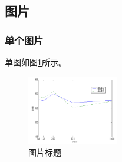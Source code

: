 \documentclass{nwputhesis}
\begin{document}
\subsection{图片}
\subsubsection{单个图片}
单图如图\ref{P1}所示。
\begin{figure}[!ht]
    \centering
    \includegraphics[width=4cm]{./picture/test.png}
    \caption{图片标题}\label{P1}
\end{figure}
\end{document}
